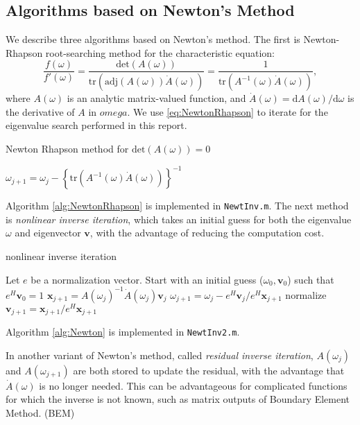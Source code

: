\documentclass[final,leqno,onefignum,onetabnum]{siamltex1213}
\newcommand{\diff}{\mathrm{d}}
\begin{document}
\subsection{Algorithms based on Newton's Method}
We describe three algorithms based on Newton's method. 
The first is Newton-Rhapson root-searching method for the characteristic equation: 
\begin{equation}\label{eq:NewtonRhapson}
\frac{f(\omega)}{f'(\omega)} = \frac{\mathrm{det}(A(\omega))}{ \mathrm{tr} \left( \mathrm{adj}(A(\omega))\dot{A}(\omega)\right)} = \frac{1}{ \mathrm{tr}\left( A^{-1}(\omega)\dot{A}(\omega)\right)},
\end{equation}
where $A(\omega)$ is an analytic matrix-valued function, and $\dot{A}(\omega)=\diff A(\omega)/\diff \omega$ is the derivative of $A$ in $omega$. We use \ref{eq:NewtonRhapson} to iterate for the eigenvalue search performed in this report. 
\begin{algorithm}
\caption{Newton Rhapson method for $\mathrm{det}(A(\omega))=0$}
\label{alg:NewtonRhapson}
\begin{algorithmic}
\STATE $\omega_{j+1} = \omega_j - \left\lbrace \mathrm{tr}\left( A^{-1}(\omega)\dot{A}(\omega)\right)\right\rbrace^{-1} $
\ENDFOR
\end{algorithmic}
\end{algorithm}
Algorithm \ref{alg:NewtonRhapson} is implemented in {\tt NewtInv.m}. 
The next method is {\it nonlinear inverse iteration}, \citep{anselone_solution_1968} which takes an initial guess for both the eigenvalue $\omega$ and eigenvector $\mathbf{v}$, with the advantage of reducing the computation cost. 
\begin{algorithm}
\caption{nonlinear inverse iteration}
\label{alg:Newton}
\begin{algorithmic}
\STATE Let $e$ be a normalization vector. Start with an initial guess ($\omega_0, \mathbf{v}_0$) such that $e^{H}\mathbf{v}_0=1$ 
\STATE $\mathbf{x}_{j+1} = A(\omega_j)^{-1} \dot{A}(\omega_j)\mathbf{v}_j$
\STATE $\omega_{j+1} = \omega_j - e^H\mathbf{v}_j/e^H\mathbf{x}_{j+1} $
\STATE normalize $\mathbf{v}_{j+1}=\mathbf{x}_{j+1}/e^{H}\mathbf{x}_{j+1}$
\ENDFOR
\end{algorithmic}
\end{algorithm}
Algorithm \ref{alg:Newton} is implemented in {\tt NewtInv2.m}. 

In another variant of Newton's method, called {\it residual inverse iteration}, \citep{neumaier1985residual} $A(\omega_j)$ and $A(\omega_{j+1})$ are both stored to update the residual, with the advantage that $\dot{A}(\omega)$ is no longer needed. This can be advantageous for complicated functions for which the inverse is not known, such as matrix outputs of Boundary Element Method. (BEM)
\end{document}

